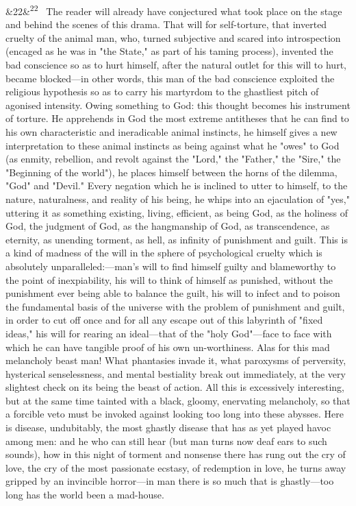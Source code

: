 \documentclass[12pt]{article}
\newcommand{\para}[1][]{\par\noindent\ifx&#1&\else\textsuperscript{\footnotesize #1}~\fi}
\begin{document}
\para[22] The reader will already have conjectured what took place on the stage and behind the scenes of this drama. That will for self-torture, that inverted cruelty of the animal man, who, turned subjective and scared into introspection (encaged as he was in "the State," as part of his taming process), invented the bad conscience so as to hurt himself, after the natural outlet for this will to hurt, became blocked---in other words, this man of the bad conscience exploited the religious hypothesis so as to carry his martyrdom to the ghastliest pitch of agonised intensity. Owing something to God: this thought becomes his instrument of torture. He apprehends in God the most extreme antitheses that he can find to his own characteristic and ineradicable animal instincts, he himself gives a new interpretation to these animal instincts as being against what he "owes" to God (as enmity, rebellion, and revolt against the "Lord," the "Father," the "Sire," the "Beginning of the world"), he places himself between the horns of the dilemma, "God" and "Devil." Every negation which he is inclined to utter to himself, to the nature, naturalness, and reality of his being, he whips into an ejaculation of "yes," uttering it as something existing, living, efficient, as being God, as the holiness of God, the judgment of God, as the hangmanship of God, as transcendence, as eternity, as unending torment, as hell, as infinity of punishment and guilt. This is a kind of madness of the will in the sphere of psychological cruelty which is absolutely unparalleled:---man's will to find himself guilty and blameworthy to the point of inexpiability, his will to think of himself as punished, without the punishment ever being able to balance the guilt, his will to infect and to poison the fundamental basis of the universe with the problem of punishment and guilt, in order to cut off once and for all any escape out of this labyrinth of "fixed ideas," his will for rearing an ideal---that of the "holy God"---face to face with which he can have tangible proof of his own un-worthiness. Alas for this mad melancholy beast man! What phantasies invade it, what paroxysms of perversity, hysterical senselessness, and mental bestiality break out immediately, at the very slightest check on its being the beast of action. All this is excessively interesting, but at the same time tainted with a black, gloomy, enervating melancholy, so that a forcible veto must be invoked against looking too long into these abysses. Here is disease, undubitably, the most ghastly disease that has as yet played havoc among men: and he who can still hear (but man turns now deaf ears to such sounds), how in this night of torment and nonsense there has rung out the cry of love, the cry of the most passionate ecstasy, of redemption in love, he turns away gripped by an invincible horror---in man there is so much that is ghastly---too long has the world been a mad-house.
\end{document}
